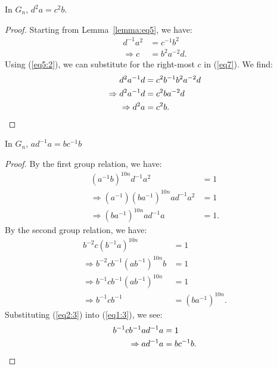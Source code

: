 \begin{lemma} In $G_n$, $d^{2}a=c^{2}b$.
\label{lemma:eq8}
\end{lemma}
\begin{proof}
Starting from Lemma~\ref{lemma:eq5}, we have:
\begin{align}
d^{-1}a^{2}&=c^{-1}b^{2}\nonumber{}\\
\Rightarrow{}c&=b^{2}a^{-2}d.\label{eq5:2}
\end{align}
Using (\ref{eq5:2}), we can substitute for the right-most $c$ in (\ref{eq7}). We find:
\begin{align*}
d^{2}a^{-1}d&=c^{2}b^{-1}b^{2}a^{-2}d\\
\Rightarrow{}d^{2}a^{-1}d&=c^{2}ba^{-2}d\\
\Rightarrow{}d^{2}a&=c^{2}b.\qedhere
\end{align*}
\end{proof}

\begin{lemma} In $G_n$, $ad^{-1}a=bc^{-1}b$
\label{lemma:eq16}
\end{lemma}
\begin{proof} By the first group relation, we have:
\begin{align}
(a^{-1}b)^{10n}d^{-1}a^{2}&=1\nonumber{}\\
\Rightarrow{}(a^{-1})(ba^{-1})^{10n}ad^{-1}a^{2}&=1\nonumber{}\\
\Rightarrow{}(ba^{-1})^{10n}ad^{-1}a&=1.\label{eq1:3}
\end{align}
By the second group relation, we have:
\begin{align}
b^{-2}c(b^{-1}a)^{10n}&=1\nonumber{}\\
\Rightarrow{} b^{-2}cb^{-1}(ab^{-1})^{10n}b&=1\nonumber{}\\
\Rightarrow{}b^{-1}cb^{-1}(ab^{-1})^{10n}&=1\nonumber{}\\
\Rightarrow{}b^{-1}cb^{-1}&=(ba^{-1})^{10n}.\label{eq2:3}
\end{align}
Substituting (\ref{eq2:3}) into (\ref{eq1:3}), we see:
\begin{align*}
b^{-1}cb^{-1}ad^{-1}a&=1\\
\Rightarrow{}ad^{-1}a&=bc^{-1}b.\qedhere
\end{align*}
\end{proof}

